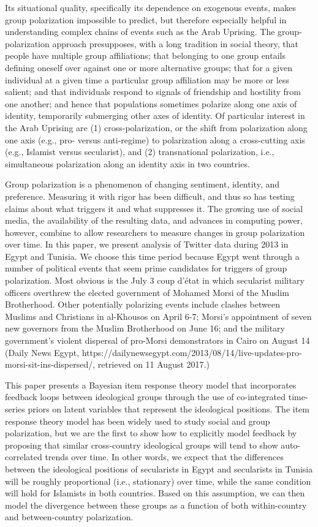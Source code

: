 \documentclass[12pt]{article}
\begin{document}
Its situational quality, specifically its dependence on exogenous events, makes group polarization impossible to predict, but therefore especially helpful in understanding complex chains of events such as the Arab Uprising.  The group-polarization approach presupposes, with a long tradition in social theory, that people have multiple group affiliations; that belonging to one group entails defining oneself over against one or more alternative groups; that for a given individual at a given time a particular group affiliation may be more or less salient; and that individuals respond to signals of friendship and hostility from one another; and hence that populations sometimes polarize along one axis of identity, temporarily submerging other axes of identity.  Of particular interest in the Arab Uprising are (1) cross-polarization, or the shift from polarization along one axis (e.g., pro- versus anti-regime) to polarization along a cross-cutting axis (e.g., Islamist versus secularist), and (2) transnational polarization, i.e., simultaneous polarization along an identity axis in two countries.

Group polarization is a phenomenon of changing sentiment, identity, and preference.  Measuring it with rigor has been difficult, and thus so has testing claims about what triggers it and what suppresses it.  The growing use of social media, the availability of the resulting data, and advances in computing power, however, combine to allow researchers to measure changes in group polarization over time.  In this paper, we present analysis of Twitter data during 2013 in Egypt and Tunisia.  We choose this time period because Egypt went through a number of political events that seem prime candidates for triggers of group polarization.  Most obvious is the July 3 coup d'état in which secularist military officers overthrew the elected government of Mohamed Morsi of the Muslim Brotherhood.  Other potentially polarizing events include clashes between Muslims and Christians in al-Khousos on April 6-7; Morsi's appointment of seven new governors from the Muslim Brotherhood on June 16; and the military government's violent dispersal of pro-Morsi demonstrators in Cairo on August 14 (Daily News Egypt, https://dailynewsegypt.com/2013/08/14/live-updates-pro-morsi-sit-ins-dispersed/, retrieved on 11 August 2017.) 

This paper presents a Bayesian item response theory model that incorporates feedback loops between ideological groups through the use of co-integrated time-series priors on latent variables that represent the ideological positions. The item response theory model has been widely used to study social and group polarization, but we are the first to show how to explicitly model feedback by proposing that similar cross-country ideological groups will tend to show auto-correlated trends over time. In other words, we expect that the differences between the ideological positions of secularists in Egypt and secularists in Tunisia will be roughly proportional (i.e., stationary) over time, while the same condition will hold for Islamists in both countries. Based on this assumption, we can then model the divergence between these groups as a function of both within-country and between-country polarization.
\end{document}
